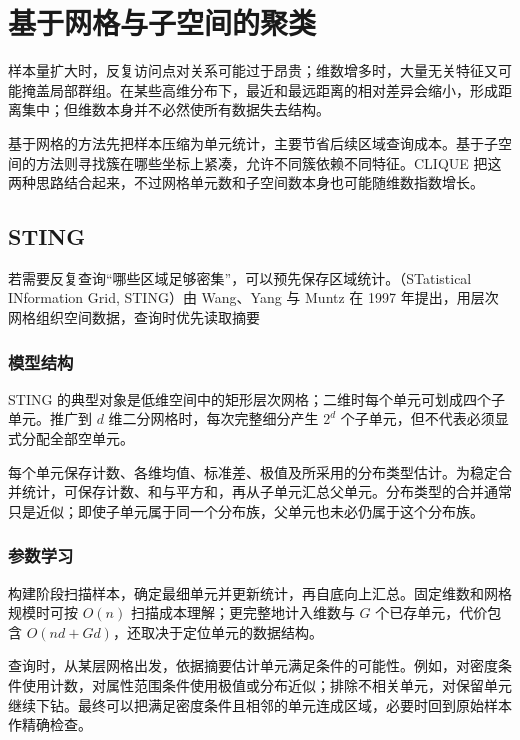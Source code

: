 \section{基于网格与子空间的聚类}
\label{sec:clustering-subspace}

样本量扩大时，反复访问点对关系可能过于昂贵；维数增多时，大量无关特征又可能掩盖局部群组。在某些高维分布下，最近和最远距离的相对差异会缩小，形成距离集中；但维数本身并不必然使所有数据失去结构。

基于网格的方法先把样本压缩为单元统计，主要节省后续区域查询成本。基于子空间的方法则寻找簇在哪些坐标上紧凑，允许不同簇依赖不同特征。CLIQUE 把这两种思路结合起来，不过网格单元数和子空间数本身也可能随维数指数增长。

\subsection{STING}

若需要反复查询“哪些区域足够密集”，可以预先保存区域统计。（STatistical INformation Grid, STING）由 Wang、Yang 与 Muntz 在 1997 年提出，用层次网格组织空间数据，查询时优先读取摘要

\subsubsection{模型结构}

STING 的典型对象是低维空间中的矩形层次网格；二维时每个单元可划成四个子单元。推广到 $d$ 维二分网格时，每次完整细分产生 $2^d$ 个子单元，但不代表必须显式分配全部空单元。

每个单元保存计数、各维均值、标准差、极值及所采用的分布类型估计。为稳定合并统计，可保存计数、和与平方和，再从子单元汇总父单元。分布类型的合并通常只是近似；即使子单元属于同一个分布族，父单元也未必仍属于这个分布族。

\subsubsection{参数学习}

构建阶段扫描样本，确定最细单元并更新统计，再自底向上汇总。固定维数和网格规模时可按 $O(n)$ 扫描成本理解；更完整地计入维数与 $G$ 个已存单元，代价包含 $O(nd+Gd)$，还取决于定位单元的数据结构。

查询时，从某层网格出发，依据摘要估计单元满足条件的可能性。例如，对密度条件使用计数，对属性范围条件使用极值或分布近似；排除不相关单元，对保留单元继续下钻。最终可以把满足密度条件且相邻的单元连成区域，必要时回到原始样本作精确检查。

